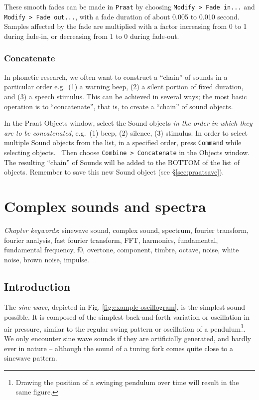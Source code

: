 \documentclass[
]{book}
\begin{document}
\label{box-praatfades}
These smooth fades can be made in \texttt{Praat} by choosing \texttt{Modify\ \textgreater{}\ Fade\ in...} and \texttt{Modify\ \textgreater{}\ Fade\ out...}, with a fade duration of about 0.005 to 0.010 second. Samples affected by the fade are multiplied with a factor increasing from 0 to 1 during fade-in, or decreasing from 1 to 0 during fade-out.

\subsection{Concatenate}\label{sec:concatenate}

In phonetic research, we often want to construct a ``chain'' of sounds in a particular order e.g.~(1) a warning beep, (2) a silent portion of fixed duration, and (3) a speech stimulus. This can be achieved in several ways; the most basic operation is to ``concatenate'', that is, to create a ``chain'' of sound objects.

\label{box-praatconcatenate}
In the Praat Objects window, select the Sound objects \emph{in the order in which they are to be concatenated}, e.g.~(1) beep, (2) silence, (3) stimulus. In order to select multiple Sound objects from the list, in a specified order, press \texttt{Command} while selecting objects.~
Then choose \texttt{Combine\ \textgreater{}\ Concatenate} in the Objects window. The resulting ``chain'' of Sounds will be added to the BOTTOM of the list of objects. Remember to save this new Sound object (see §\ref{sec:praatsave}).

\chapter{Complex sounds and spectra}\label{complex-sounds-and-spectra}

\emph{Chapter keywords}: sinewave sound, complex sound, spectrum, fourier transform, fourier analysis, fast fourier transform, FFT, harmonics, fundamental, fundamental frequency, f0, overtone, component, timbre, octave, noise, white noise, brown noise, impulse.

\section{Introduction}\label{sec:FTintro}

The \emph{sine wave}, depicted in Fig. \ref{fig:example-oscillogram}, is the simplest sound possible. It is composed of the simplest back-and-forth variation or oscillation in air pressure, similar to the regular swing pattern or oscillation of a pendulum\footnote{Drawing the position of a swinging pendulum over time will result in the same figure.}. We only encounter sine wave sounds if they are artificially generated, and hardly ever in nature -- although the sound of a tuning fork comes quite close to a sinewave pattern.
\end{document}

